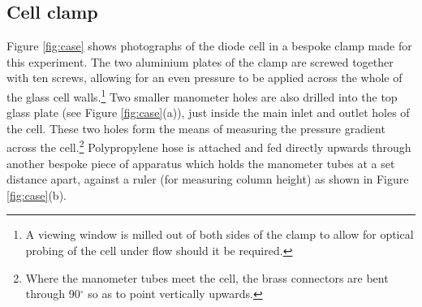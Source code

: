 \subsection{Cell clamp}
Figure \ref{fig:case} shows photographs of the diode cell in a bespoke clamp made for this experiment. The two aluminium plates of the clamp are screwed together with ten screws, allowing for an even pressure to be applied across the whole of the glass cell walls.\footnote{A viewing window is milled out of both sides of the clamp to allow for optical probing of the cell under flow should it be required.} Two smaller manometer holes are also drilled into the top glass plate (see Figure \ref{fig:case}(a)), just inside the main inlet and outlet holes of the cell. These two holes form the means of measuring the pressure gradient across the cell.\footnote{Where the manometer tubes meet the cell, the brass connectors are bent through 90$^{\circ}$ so as to point vertically upwards.} Polypropylene hose is attached and fed directly upwards through another bespoke piece of apparatus which holds the manometer tubes at a set distance apart, against a ruler (for measuring column height) as shown in Figure \ref{fig:case}(b).

